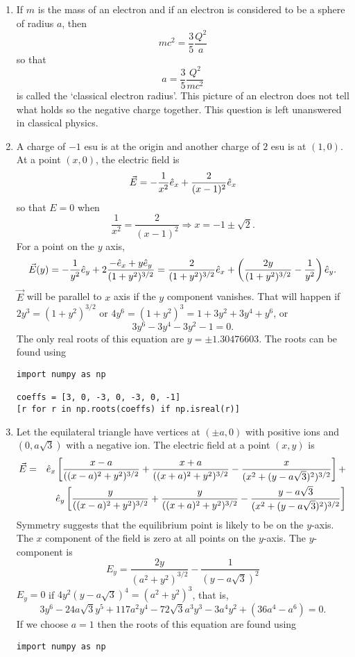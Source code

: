 \documentclass{article}
\begin{document}
\begin{enumerate}
\item If $m$ is the mass of an electron and if an electron is considered to be a
sphere of radius $a$, then
\[
mc^2 =  \frac{3}{5}\frac{Q^2}{a}
\]
so that
\begin{equation}\label{e17}
a = \frac{3}{5}\frac{Q^2}{mc^2}
\end{equation}
is called the `classical electron radius'. This picture of an electron does not 
tell what holds so the negative charge together. This question is left unanswered
in classical physics.

\item A charge of $-1$ esu is at the origin and another charge of $2$ esu is at
$(1, 0)$. At a point $(x, 0)$, the electric field is
\[
\vec{E} = -\frac{1}{x^2}\hat{e}_{x} + \frac{2}{(x - 1)^2}\hat{e}_{x}
\]
so that $E = 0$ when
\[
\frac{1}{x^2} = \frac{2}{(x - 1)^2} \Rightarrow x = -1 \pm \sqrt{2}.
\]
For a point on the $y$ axis,
\[
\vec{E}(y) = -\frac{1}{y^2}\hat{e}_{y} + 2\frac{-\hat{e}_{x} + y\hat{e}_{y}}{(1 + y^2)^{3/2}} =
\frac{2}{(1 + y^2)^{3/2}}\hat{e}_{x} + \left(\frac{2y}{(1 + y^2)^{3/2}} - \frac{1}{y^2}\right)\hat{e}_{y}.
\]
$\vec{E}$ will be parallel to $x$ axis if the $y$ component vanishes. That will
happen if $2y^3 = (1 + y^2)^{3/2}$ or $4y^6 = (1 + y^2)^3 = 1 + 3y^2 + 3y^4 + y^6$,
or
\[
3y^6 - 3y^4 - 3y^2 - 1 = 0.
\]
The only real roots of this equation are $y = \pm 1.30476603$. The roots can be
found using
\begin{verbatim}
import numpy as np

coeffs = [3, 0, -3, 0, -3, 0, -1]
[r for r in np.roots(coeffs) if np.isreal(r)]
\end{verbatim}

\item Let the equilateral triangle have vertices at $(\pm a, 0)$ with positive
ions and $(0, a\sqrt{3})$ with a negative ion. The electric field at a point
$(x, y)$ is
\begin{eqnarray*}
\vec{E} &=& \hat{e}_{x}\left[\frac{x-a}{((x-a)^2+y^2)^{3/2}}+
            \frac{x+a}{((x+a)^2+y^2)^{3/2}}-\frac{x}{(x^2+(y-a\sqrt{3})^2)^{3/2}}\right]+\\
 & &\hat{e}_{y}\left[\frac{y}{((x-a)^2+y^2)^{3/2}}+\frac{y}{((x+a)^2+y^2)^{3/2}}-
    \frac{y - a\sqrt{3}}{(x^2+(y-a\sqrt{3})^2)^{3/2}}\right]
\end{eqnarray*}
Symmetry suggests that the equilibrium point is likely to be on the $y$-axis. The
$x$ component of the field is zero at all points on the $y$-axis. The $y$-component
is
\[
E_y = \frac{2y}{(a^2+y^2)^{3/2}} - \frac{1}{(y-a\sqrt{3})^2}
\]    
$E_y = 0$ if $4y^2(y - a\sqrt{3})^4 = (a^2 + y^2)^3$, that is,
\begin{equation}\label{e18}
3y^6 - 24a\sqrt{3}y^5 + 117 a^2y^4 - 72\sqrt{3}a^3y^3 - 3a^4y^2 + (36a^4 - a^6) = 0.
\end{equation}
If we choose $a = 1$ then the roots of this equation are found using
\begin{verbatim}
import numpy as np


\end{verbatim}
\end{enumerate}
\end{document}
